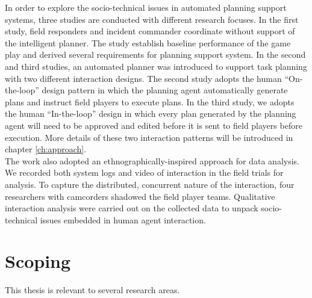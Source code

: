 In order to explore the socio-technical issues in automated planning support systems, three studies are conducted with different research focuses. In the first study, field responders and incident commander coordinate without support of the intelligent planner. The study establish baseline performance of the game play and derived several requirements for planning support system. In the second and third studies, an automated planner was introduced to support task planning with two different interaction designs. The second study adopts the human ``On-the-loop'' design pattern in which the planning agent automatically generate plans and instruct field players to execute plans. In the third study, we adopts the human ``In-the-loop'' design in which every plan generated by the planning agent will need to be approved and edited before it is sent to field players before execution. More details of these two interaction patterns will be introduced in chapter \ref{ch:approach}.\\

The work also adopted an ethnographically-inspired approach for data analysis. We recorded both system logs and video of interaction in the field trials for analysis. To capture the distributed, concurrent nature of the interaction, four researchers with camcorders shadowed the field player teams. Qualitative interaction analysis were carried out on the collected data to unpack socio-technical issues embedded in human agent interaction.\\


\section{Scoping}\label{sec:custom}
This thesis is relevant to several research areas. \\

